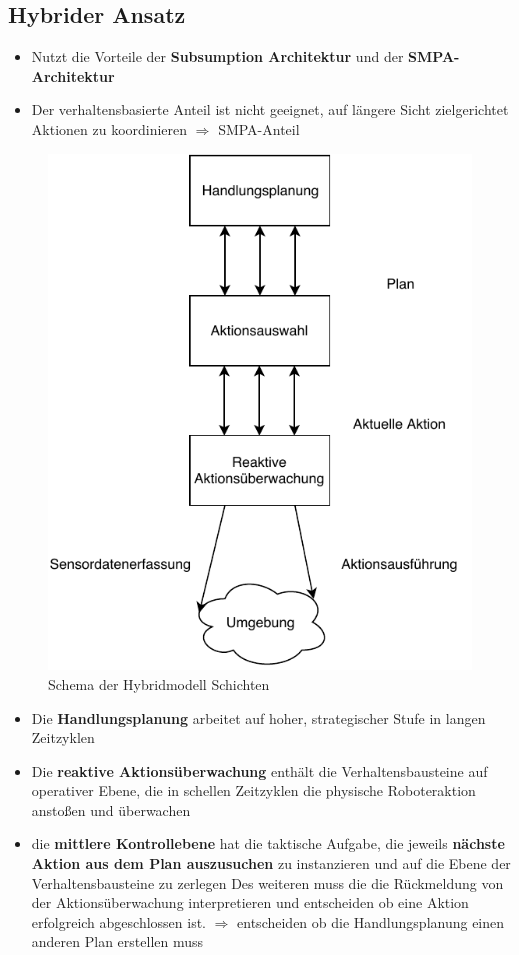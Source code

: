 \subsection{Hybrider Ansatz}
\begin{itemize}
	\item Nutzt die Vorteile der \textbf{Subsumption Architektur} und der \textbf{SMPA-Architektur}
	\item Der verhaltensbasierte Anteil ist nicht geeignet, auf längere Sicht zielgerichtet Aktionen zu koordinieren $\Rightarrow$ SMPA-Anteil
\end{itemize}
\begin{figure}[H]
	\begin{center}
		\includegraphics[scale=0.9]{Resources/PDF/HybridModel}
		\caption{Schema der Hybridmodell Schichten}
		\label{fig:PDF/HybridModel}
	\end{center}
\end{figure}
\begin{itemize}
	\item Die \textbf{Handlungsplanung} arbeitet auf hoher, strategischer Stufe in langen Zeitzyklen
	\item Die \textbf{reaktive Aktionsüberwachung} enthält die Verhaltensbausteine auf operativer Ebene, die in schellen Zeitzyklen die physische Roboteraktion anstoßen und überwachen
	\item die \textbf{mittlere Kontrollebene} hat die taktische Aufgabe, die jeweils \textbf{nächste Aktion aus dem Plan auszusuchen} zu instanzieren und auf die Ebene der Verhaltensbausteine zu zerlegen
	Des weiteren muss die die Rückmeldung von der Aktionsüberwachung interpretieren und entscheiden ob eine Aktion erfolgreich abgeschlossen ist. $\Rightarrow$ entscheiden ob die Handlungsplanung einen anderen Plan erstellen muss
\end{itemize}
\newpage
